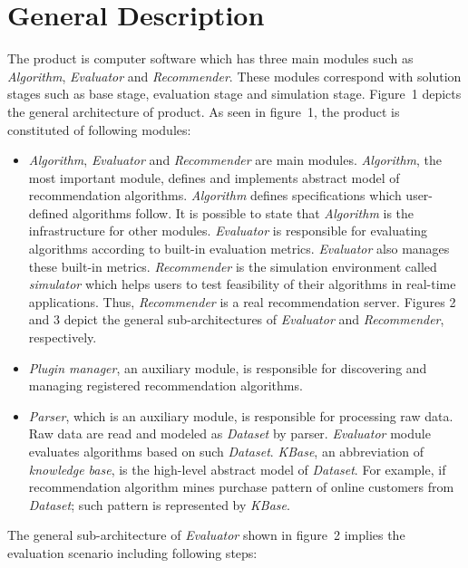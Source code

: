 \documentclass[a4paper]{llncs}
\begin{document}
\section{General Description}
\label{sec:description}
The product is computer software which has three main modules such as \textit{Algorithm}, \textit{Evaluator} and \textit{Recommender}. These modules correspond with solution stages such as base stage, evaluation stage and simulation stage. Figure~1 depicts the general architecture of product. As seen in figure~1, the product is constituted of following modules:
\begin{itemize}
\item \textit{Algorithm}, \textit{Evaluator} and \textit{Recommender} are main modules. \textit{Algorithm}, the most important module, defines and implements abstract model of recommendation algorithms. \textit{Algorithm} defines specifications which user-defined algorithms follow. It is possible to state that \textit{Algorithm} is the infrastructure for other modules. \textit{Evaluator} is responsible for evaluating algorithms according to built-in evaluation metrics. \textit{Evaluator} also manages these built-in metrics. \textit{Recommender} is the simulation environment called \textit{simulator} which helps users to test feasibility of their algorithms in real-time applications. Thus, \textit{Recommender} is a real recommendation server. Figures 2 and 3 depict the general sub-architectures of \textit{Evaluator} and \textit{Recommender}, respectively.
\item \textit{Plugin manager}, an auxiliary module, is responsible for discovering and managing registered recommendation algorithms.
\item \textit{Parser}, which is an auxiliary module, is responsible for processing raw data. Raw data are read and modeled as \textit{Dataset} by parser. \textit{Evaluator} module evaluates algorithms based on such \textit{Dataset}. \textit{KBase}, an abbreviation of \textit{knowledge base}, is the high-level abstract model of \textit{Dataset}. For example, if recommendation algorithm mines purchase pattern of online customers from \textit{Dataset}; such pattern is represented by \textit{KBase}.
\end{itemize}
The general sub-architecture of \textit{Evaluator} shown in figure~2 implies the evaluation scenario including following steps:
\end{document}

